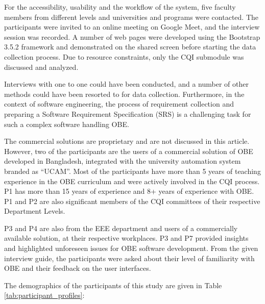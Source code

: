 \documentclass[journal,onecolumn]{IEEEtran}
\begin{document}
For the accessibility, usability and the workflow of the system, five faculty members from different levels and universities and programs were contacted. The participants were invited to an online meeting on Google Meet, and the interview session was recorded. A number of web pages were developed using the Bootstrap 3.5.2 framework and demonstrated on the shared screen before starting the data collection process. Due to resource constraints, only the CQI submodule was discussed and analyzed. 

Interviews with one to one could have been conducted, and a number of other methods could have been resorted to for data collection. Furthermore, in the context of software engineering, the process of requirement collection and preparing a Software Requirement Specification (SRS) is a challenging task for such a complex software handling OBE. 

The commercial solutions are proprietary and are not discussed in this article. However, two of the participants are the users of a commercial solution of OBE developed in Bangladesh, integrated with the university automation system branded as “UCAM”. Most of the participants have more than 5 years of teaching experience in the OBE curriculum and were actively involved in the CQI process. P1 has more than 15 years of experience and 8+ years of experience with OBE. P1 and P2 are also significant members of the CQI committees of their respective Department Levels. 

P3 and P4 are also from the EEE department and users of a commercially available solution, at their respective workplaces. P3 and P7 provided insights and highlighted unforeseen issues for OBE software development. From the given interview guide, the participants were asked about their level of familiarity with OBE and their feedback on the user interfaces.

The demographics of the participants of this study are given in Table \ref{tab:participant_profiles}:
\end{document}
